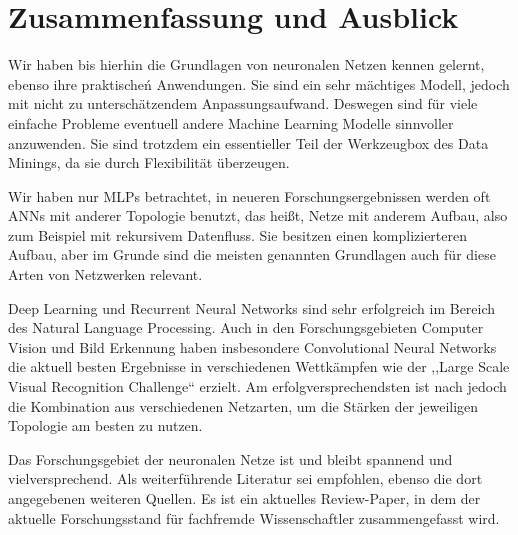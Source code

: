 \section{Zusammenfassung und Ausblick}
Wir haben bis hierhin die Grundlagen von neuronalen Netzen kennen gelernt, ebenso ihre praktischeń Anwendungen. 
Sie sind ein sehr mächtiges Modell, jedoch mit nicht zu unterschätzendem Anpassungsaufwand. Deswegen sind für viele einfache Probleme eventuell andere Machine Learning Modelle sinnvoller anzuwenden. Sie sind trotzdem ein essentieller Teil der Werkzeugbox des Data Minings, da sie durch Flexibilität überzeugen. 

Wir haben nur MLPs betrachtet, in neueren Forschungsergebnissen werden oft ANNs mit anderer Topologie benutzt, das heißt, Netze mit anderem Aufbau, also zum Beispiel mit rekursivem Datenfluss. Sie besitzen einen komplizierteren Aufbau, aber im Grunde sind die meisten genannten Grundlagen auch für diese Arten von Netzwerken relevant. 

Deep Learning und Recurrent Neural Networks sind sehr erfolgreich im Bereich des Natural Language Processing. Auch in den Forschungsgebieten Computer Vision und Bild Erkennung haben insbesondere Convolutional Neural Networks die aktuell besten Ergebnisse in verschiedenen Wettkämpfen wie der  ,,Large Scale Visual Recognition Challenge`` erzielt. Am erfolgversprechendsten ist nach \cite{LeCun2015} jedoch die Kombination aus verschiedenen Netzarten, um die Stärken der jeweiligen Topologie am besten zu nutzen. 

Das Forschungsgebiet der neuronalen Netze ist und bleibt spannend und vielversprechend. Als weiterführende Literatur sei \cite{LeCun2015} empfohlen, ebenso die dort angegebenen weiteren Quellen. Es ist ein aktuelles Review-Paper, in dem der aktuelle Forschungsstand für fachfremde Wissenschaftler zusammengefasst wird.

